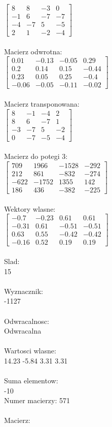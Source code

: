 \documentclass[a4paper,12pt]{article}
\begin{document}
$\begin{bmatrix} 8&8&-3&0\\-1&6&-7&-7\\-4&-7&5&-5\\2&1&-2&-4 \end{bmatrix}$
\\
\\
Macierz odwrotna:\\

$\begin{bmatrix} 0.01&-0.13&-0.05&0.29\\0.2&0.14&0.15&-0.44\\0.23&0.05&0.25&-0.4\\-0.06&-0.05&-0.11&-0.02 \end{bmatrix}$
\\
\\
Macierz transponowana:\\

$\begin{bmatrix} 8&-1&-4&2\\8&6&-7&1\\-3&-7&5&-2\\0&-7&-5&-4 \end{bmatrix}$
\\
\\
Macierz do potegi 3:\\

$\begin{bmatrix} 709&1966&-1528&-292\\212&861&-832&-274\\-622&-1752&1355&142\\186&436&-382&-225 \end{bmatrix}$
\\
\\
Wektory wlasne:\\

$\begin{bmatrix} -0.7&-0.23&0.61&0.61\\-0.31&0.61&-0.51&-0.51\\0.63&0.55&-0.42&-0.42\\-0.16&0.52&0.19&0.19 \end{bmatrix}$
\\
\\
Slad:\\
15
\\
\\
Wyznacznik:\\
-1127
\\
\\
Odwracalnosc:\\
Odwracalna
\\
\\
Wartosci wlasne:\\
14.23 -5.84 3.31 3.31
\\
\\
Suma elementow:\\
-10
\\
\newpage
Numer macierzy:
571
\\
\\
Macierz:\\
\end{document}
